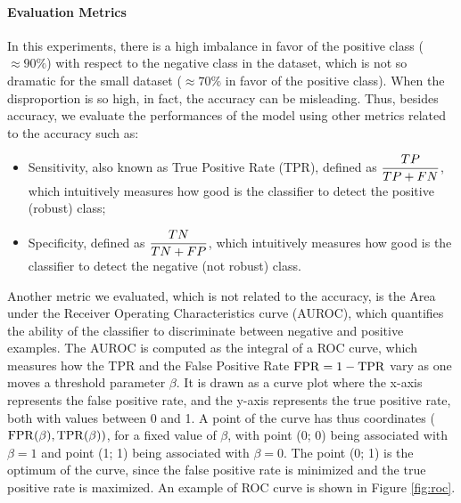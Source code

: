 \paragraph{Evaluation Metrics} In this experiments, there is a high imbalance in favor of the positive class ($\approx 90\%$) with respect to the negative class in the dataset, which is not so dramatic for the small dataset ($\approx 70\%$ in favor of the positive class). When the disproportion is so high, in fact, the accuracy can be misleading. Thus, besides accuracy, we evaluate the performances of the model using other metrics related to the accuracy such as:
\begin{itemize}
    \item Sensitivity, also known as True Positive Rate (TPR), defined as ${\displaystyle\frac{TP}{TP + FN}}$, which intuitively measures how good is the classifier to detect the positive (robust) class;
    \item Specificity, defined as ${\displaystyle\frac{TN}{TN + FP}}$, which intuitively measures how good is the classifier to detect the negative (not robust) class.
\end{itemize}
Another metric we evaluated, which is not related to the accuracy, is the Area under the Receiver Operating Characteristics curve (AUROC), which quantifies the ability of the classifier to discriminate between negative and positive examples. The AUROC is computed as the integral of a ROC curve, which measures how the TPR and the False Positive Rate $\mathrm{FPR} = 1 - \mathrm{TPR}$ vary as one moves a threshold parameter $\beta$. It is drawn as a curve plot where the x-axis represents the false positive rate, and the y-axis represents the true positive rate, both with values between 0 and 1. A point of the curve has thus coordinates ($\mathrm{FPR}(\beta), \mathrm{TPR}(\beta))$, for a fixed value of $\beta$, with point (0; 0) being associated with $\beta = 1$ and point (1; 1) being associated with $\beta = 0$. The point (0; 1) is the optimum of the curve, since the false positive rate is minimized and the true positive rate is maximized. An example of ROC curve is shown in Figure \ref{fig:roc}.

